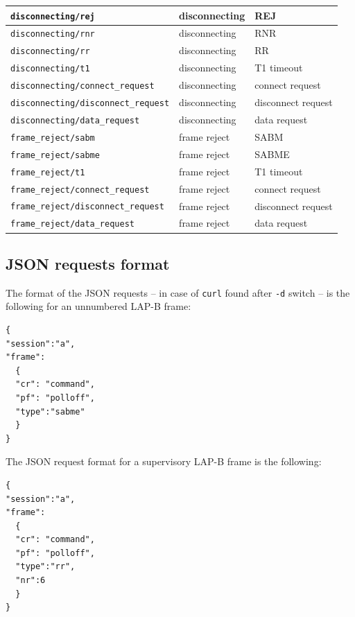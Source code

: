\documentclass[a4paper]{article}
\begin{document}
{\begin{center}
\begin{tabular}[h]{|l|l|l|}
        \hline
        \verb'disconnecting/rej' & disconnecting & REJ                 \\
        \hline
        \verb'disconnecting/rnr' & disconnecting & RNR                 \\
        \hline
        \verb'disconnecting/rr' & disconnecting & RR                  \\
        \hline
        \verb'disconnecting/t1' & disconnecting & T1 timeout          \\
        \hline
        \verb'disconnecting/connect_request' & disconnecting & connect request     \\
        \hline
        \verb'disconnecting/disconnect_request' & disconnecting & disconnect request  \\
        \hline
        \verb'disconnecting/data_request' & disconnecting & data request        \\
        \hline
        \verb'frame_reject/sabm' & frame reject  & SABM                \\
        \hline
        \verb'frame_reject/sabme' & frame reject  & SABME               \\
        \hline
        \verb'frame_reject/t1' & frame reject  & T1 timeout          \\
        \hline
        \verb'frame_reject/connect_request' & frame reject  & connect request     \\
        \hline
        \verb'frame_reject/disconnect_request' & frame reject  & disconnect request  \\
        \hline
        \verb'frame_reject/data_request' & frame reject  & data request        \\
        \hline
    \end{tabular}
\end{center}
}

\subsection{JSON requests format}

The format of the JSON requests -- in case of \verb!curl! found after \verb!-d!
switch -- is the following for an unnumbered LAP-B frame:
\begin{verbatim}
{
"session":"a", 
"frame": 
  {
  "cr": "command", 
  "pf": "polloff", 
  "type":"sabme"
  }
}
\end{verbatim}

The JSON request format for a supervisory LAP-B frame is the following:
\begin{verbatim}
{
"session":"a", 
"frame": 
  {
  "cr": "command", 
  "pf": "polloff", 
  "type":"rr",
  "nr":6
  }
}
\end{verbatim}
\end{document}
